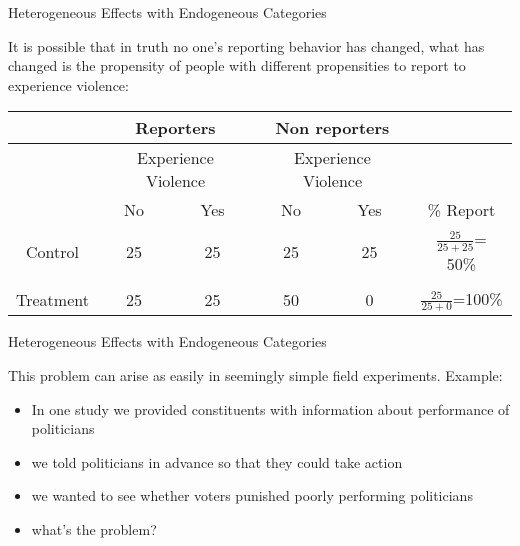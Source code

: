 \documentclass[11pt,ignorenonframetext,]{beamer}
\begin{document}
\begin{frame}{Heterogeneous Effects with Endogeneous Categories}

It is possible that in truth no one's reporting behavior has changed,
what has changed is the propensity of people with different propensities
to report to experience violence:

\begin{table}
\centering
\begin{tabular}{c|cc|cc|c}\scriptsize

           & \multicolumn{ 2}{c}{Reporters} & \multicolumn{ 2}{c}{Non reporters} &            \\ \hline
           & \multicolumn{ 2}{c}{Experience Violence} & \multicolumn{ 2}{c}{Experience Violence} &            \\ \hline \hline
           &         No &        Yes &        No  &        Yes &  \% Report \\

   Control &         25 &         {\color{red}25} &         25 &        {\color{red}25} &       {\color{red} $\frac{25}{25+25}$}= 50\% \\  
   & & & & \\
  Treatment &         25 &         {\color{red}25} &         50 &          {\color{red}0} &      {\color{red}$\frac{25}{25+0}$}=100\% \\ \hline

\end{tabular}  
\end{table}

\end{frame}

\begin{frame}{Heterogeneous Effects with Endogeneous Categories}

This problem can arise as easily in seemingly simple field experiments.
Example:

\begin{itemize}
  \item In one study we provided constituents with information about performance of politicians
  \item we told politicians in advance so that they could take action
  \item we wanted to see whether voters punished poorly performing politicians
  \item what's the problem?
\end{itemize}

\end{frame}
\end{document}
